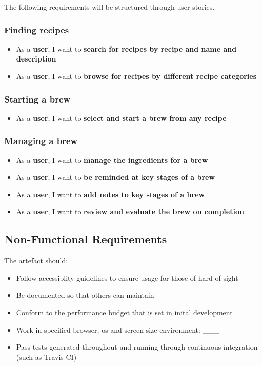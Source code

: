 The following requirements will be structured through user stories. %

\subsubsection{Finding recipes}

\begin{itemize}
  \item As a \textbf{user}, I want to \textbf{search for recipes by recipe and name and description}
  \item As a \textbf{user}, I want to \textbf{browse for recipes by different recipe categories}
\end{itemize}

\subsubsection{Starting a brew}

\begin{itemize}
  \item As a \textbf{user}, I want to \textbf{select and start a brew from any recipe}
\end{itemize}

\subsubsection{Managing a brew}

\begin{itemize}
  \item As a \textbf{user}, I want to \textbf{manage the ingredients for a brew}
  \item As a \textbf{user}, I want to \textbf{be reminded at key stages of a brew}
  \item As a \textbf{user}, I want to \textbf{add notes to key stages of a brew}
  \item As a \textbf{user}, I want to \textbf{review and evaluate the brew on completion}
\end{itemize}

\subsection{Non-Functional Requirements} \label{a-d--requirements--non-functional}

The artefact should:

\begin{itemize}
  \item Follow accessiblity guidelines to ensure usage for those of hard of sight
  \item Be documented so that others can maintain
  \item Conform to the performance budget that is set in inital development
  \item Work in specified browser, os and screen size environment: ___
  \item Pass tests generated throughout and running through continuous integration (such as Travis CI)
\end{itemize}

